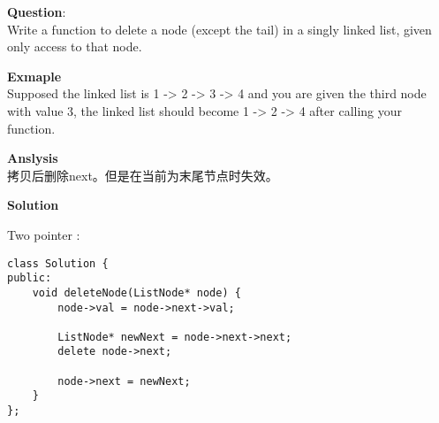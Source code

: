     
\begin{description}
    \item{\textbf{Question}}:\\%
		Write a function to delete a node (except the tail) in a singly linked list, given only access to that node.\\

    \item{\textbf{Exmaple}}\\
		Supposed the linked list is 1 -> 2 -> 3 -> 4 and you are given the third node with value 3, the linked list should become 1 -> 2 -> 4 after calling your function.\\

    \item{\textbf{Anslysis}}\\
		拷贝后删除next。但是在当前为末尾节点时失效。\\

    \item{\textbf{Solution}}
	\item{Two pointer} : \\
		\begin{lstlisting}
class Solution {
public:
    void deleteNode(ListNode* node) {
		node->val = node->next->val;

		ListNode* newNext = node->next->next;
		delete node->next;

		node->next = newNext;
    }
};		\end{lstlisting}

\end{description}

